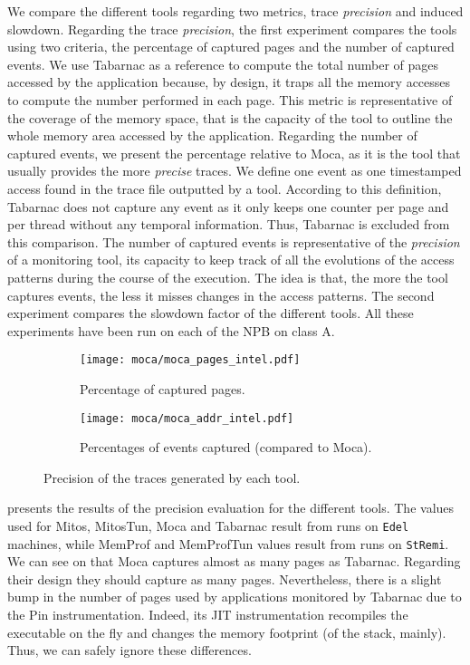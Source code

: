 We compare the different tools regarding two metrics, trace \emph{precision} and induced slowdown.
Regarding the trace \emph{precision}, the first experiment compares the tools using two criteria, the percentage of captured pages and the number of captured events.
We use \gls{Tabarnac} as a reference to compute the total number of pages accessed by the application because, by design, it traps all the memory accesses to compute the number performed in each page.
This metric is representative of the coverage of the memory space, that is the capacity of the tool to outline the whole memory area accessed by the application.
Regarding the number of captured events, we present the percentage relative to \gls{Moca}, as it is the tool that usually provides the more \emph{precise} traces.
We define one event as one timestamped access found in the trace file outputted by a tool.
According to this definition, \gls{Tabarnac} does not capture any event as it only keeps one counter per page and per thread without any temporal information.
Thus, \gls{Tabarnac} is excluded from this comparison.
The number of captured events is representative of the \emph{precision} of a monitoring tool, its capacity to keep track of all the evolutions of the access patterns during the course of the execution.
The idea is that, the more the tool captures events, the less it misses changes in the access patterns.
The second experiment compares the slowdown factor of the different tools.
All these experiments have been run on each of the \gls{NPB} on class A.

\begin{figure}[htb]
    \centering
    \begin{subfigure}{.73\linewidth}
        \texttt{[image: moca/moca\_pages\_intel.pdf]}
        \caption{Percentage of captured pages.}
        \label{fig:pages}
    \end{subfigure}
    \begin{subfigure}{.73\linewidth}
        \texttt{[image: moca/moca\_addr\_intel.pdf]}
        \caption{Percentages of events captured (compared to \gls{Moca}).}
        \label{fig:addr}
    \end{subfigure}
    \caption{Precision of the traces generated by each tool.}
    \label{fig:pages-addr}
\end{figure}

 presents the results of the precision evaluation for the different tools.
The values used for \gls{Mitos}, MitosTun, \gls{Moca} and \gls{Tabarnac} result from runs on \texttt{Edel} machines, while \gls{MemProf} and MemProfTun values result from runs on \texttt{StRemi}.
We can see on  that \gls{Moca} captures almost as many pages as \gls{Tabarnac}.
Regarding their design they should capture as many pages.
Nevertheless, there is a slight bump in the number of pages used by applications monitored by \gls{Tabarnac} due to the Pin instrumentation.
Indeed, its JIT instrumentation recompiles the executable on the fly and changes the memory footprint (of the stack, mainly).
Thus, we can safely ignore these differences.

